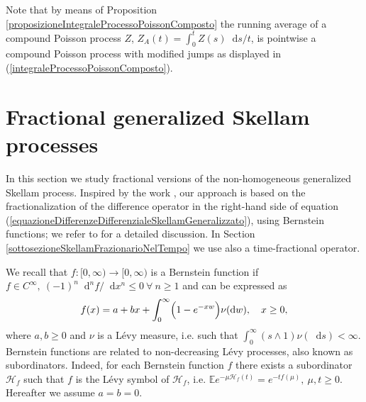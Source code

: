 \documentclass[12pt, twoside, english, headsepline]{article}
\newcommand*\dif{\mathop{}\!\mathrm{d}}  %
\theoremstyle{definition} %
\newtheorem{remark}{Remark}[section] %
\numberwithin{equation}{section} %
\begin{document}
Note that by means of Proposition \ref{proposizioneIntegraleProcessoPoissonComposto} the running average of a compound Poisson process $Z$, $Z_A (t)=\int_0^t Z(s)\dif s /t $, is pointwise a compound Poisson process with modified jumps as displayed in (\ref{integraleProcessoPoissonComposto}). 

\section{Fractional generalized Skellam processes}\label{sezioneSkellamFrazionario}

In this section we study fractional versions of the non-homogeneous generalized Skellam process. Inspired by the work \cite{OT2015}, our approach is based on the fractionalization of the difference operator in the right-hand side of equation (\ref{equazioneDifferenzeDifferenzialeSkellamGeneralizzato}), using Bernstein functions; we refer to \cite{SSV2012} for a detailed discussion. In Section \ref{sottosezioneSkellamFrazionarioNelTempo} we use also a time-fractional operator.

We recall that $f:[0,\infty)\longrightarrow [0,\infty)$ is a Bernstein function if $f\in C^\infty, \ (-1)^n \dif^n f/\dif x^n \le 0\ \forall \ n\ge1$ and can be expressed as
\begin{equation}
f(x) = a+bx+ \int_0^\infty\Bigl( 1-e^{-xw}\Bigr) \nu(\dif w), \ \ \ x\ge0,
\end{equation}
where $a,b\ge0$ and $\nu$ is a L\'{e}vy measure, i.e. such that $\int_0^\infty (s\wedge1)\nu(\dif s)<\infty$.
Bernstein functions are related to non-decreasing L\'{e}vy processes, also known as subordinators. Indeed, for each Bernstein function $f$ there exists a subordinator $\mathcal{H}_f$ such that $f$ is the L\'{e}vy symbol of $\mathcal{H}_f$, i.e. $\mathbb{E}e^{-\mu\mathcal{H}_f(t)} = e^{-tf(\mu)}, \ \mu, t\ge0$. Hereafter we assume $a=b=0$.
\end{document}
